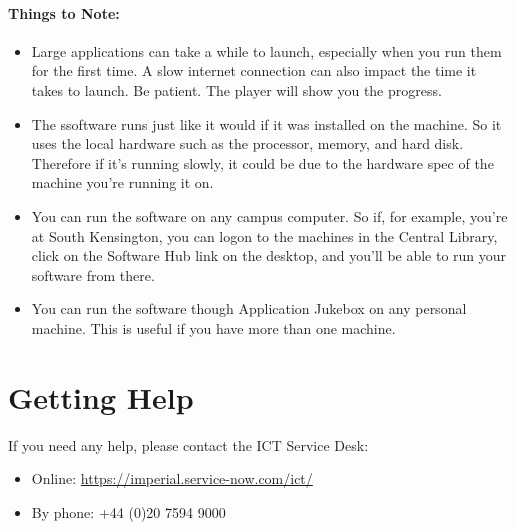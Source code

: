 \documentclass[11pt]{article}
\begin{document}
\paragraph*{Things to Note:}
\begin{itemize}
  \item Large applications can take a while to launch, especially when you run them for the first time. A slow internet connection can also impact the time it takes to launch. Be patient. The player will show you the progress.
  \item The ssoftware runs just like it would if it was installed on the machine. So it uses the local hardware such as the processor, memory, and hard disk. Therefore if it’s running slowly, it could be due to the hardware spec of the machine you’re running it on.
  \item You can run the software on any campus computer. So if, for example, you’re at South Kensington, you can logon to the machines in the Central Library, click on the Software Hub link on the desktop, and you’ll be able to run your software from there.
  \item You can run the software though Application Jukebox on any personal machine. This is useful if you have more than one machine. 
\end{itemize}


\section{Getting Help}

If you need any help, please contact the ICT Service Desk:
\begin{itemize}
  \item Online:     \url{https://imperial.service-now.com/ict/}
  \item By phone:   +44 (0)20 7594 9000
\end{itemize}
\end{document}
